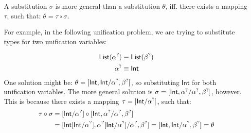 \documentclass[twoside,12pt,a4paper]{article}
\begin{document}
\iffalse
\begin{example}[Idempotency]
    $[\excopatmatch{\ap{x}\Rightarrow x} / y]$ is idempotent, since:
    \begin{align*}
        &[\excopatmatch{\ap{x}\Rightarrow x} / y] \circ [\excopatmatch{\ap{x}\Rightarrow x} / y] \tag{1}\\
        =& [\excopatmatch{\ap{x}\Rightarrow x}[\excopatmatch{\ap{x}\Rightarrow x} / y] / y] \\
        =& [\excopatmatch{\ap{x}\Rightarrow x} / y] 
    \end{align*}
On the other hand, the substitution $[\excopatmatch{\ap{y}\Rightarrow x} / x]$ is not idempotent, since:
\begin{align*}
    &[\excopatmatch{\ap{y}\Rightarrow x} / x] \circ [\excopatmatch{\ap{y}\Rightarrow x} / x]\tag{2}\\ 
    =& [\excopatmatch{\ap{y}\Rightarrow x}[\excopatmatch{\ap{y}\Rightarrow x} / x] / x] \\
    =& \excopatmatch{\ap{y}\Rightarrow (\ap{y}\Rightarrow x) } \neq [\excopatmatch{\ap{y}\Rightarrow x} / x]
\end{align*}
\end{example}
\fi

\begin{definition}\label{more general}
    A substitution $\sigma$ is more general than a substitution $\theta$, iff. there exists a mapping $\tau$, such that: $\theta = \tau \circ \sigma$.
\end{definition}

For example, in the following unification problem, we are trying to substitute types for two unification variables:
\begin{example}
    \begin{align*}
        \mathsf{List}(\alpha^?) &\equiv \mathsf{List}(\beta^?)\\
        \alpha^? &\equiv \mathsf{Int}
    \end{align*}
    One solution might be: $\theta = [\mathsf{Int, Int / \alpha^?, \beta^?}]$, 
so substituting $\mathsf{Int}$ for both unification variables.
The more general solution is $\sigma = [\mathsf{Int,\alpha^? / \alpha^?, \beta^?}]$, however.
This is because there exists a mapping $\tau = [\mathsf{Int / \alpha^?}]$, such that:
\begin{align*}
    \tau \circ \sigma &= [\mathsf{Int / \alpha^?}]\circ[\mathsf{Int,\alpha^? / \alpha^?, \beta^?}] \\
    &= [\mathsf{Int[Int/\alpha^?], \alpha^?[Int/\alpha^?] / \alpha^?, \beta^?]= [Int, Int / \alpha^?, \beta^?]= \theta}
\end{align*}    
\end{example}
\end{document}
